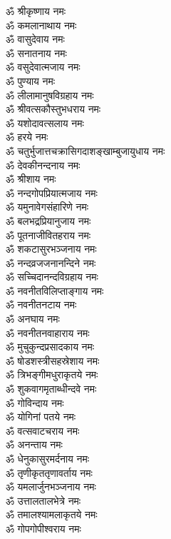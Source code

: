 \begin{center}
\begin{multicols}{2}\setlength{\columnseprule}{1pt}
\begin{flushleft}
ॐ श्रीकृष्णाय नमः\\
ॐ कमलानाथाय नमः\\
ॐ वासुदेवाय नमः\\
ॐ सनातनाय नमः\\
ॐ वसुदेवात्मजाय नमः\\
ॐ पुण्याय नमः\\
ॐ लीलामानुषविग्रहाय नमः\\
ॐ श्रीवत्सकौस्तुभधराय नमः\\
ॐ यशोदावत्सलाय नमः\\
ॐ हरये नमः\hfill{}\\
ॐ चतुर्भुजात्तचक्रासि\-गदाशङ्खाम्बुजायुधाय नमः\\
ॐ देवकीनन्दनाय नमः\\
ॐ श्रीशाय नमः\\
ॐ नन्दगोपप्रियात्मजाय नमः\\
ॐ यमुनावेगसंहारिणे नमः\\
ॐ बलभद्रप्रियानुजाय नमः\\
ॐ पूतनाजीवितहराय नमः\\
ॐ शकटासुरभञ्जनाय नमः\\
ॐ नन्दव्रजजनानन्दिने नमः\\
ॐ सच्चिदानन्दविग्रहाय नमः\hfill{}\\
ॐ नवनीतविलिप्ताङ्गाय नमः\\
ॐ नवनीतनटाय नमः\\
ॐ अनघाय नमः\\
ॐ नवनीतनवाहाराय नमः\\
ॐ मुचुकुन्दप्रसादकाय नमः\\
ॐ षोडशस्त्रीसहस्रेशाय नमः\\
ॐ त्रिभङ्गीमधुराकृतये नमः\\
ॐ शुकवागमृताब्धीन्दवे नमः\\
ॐ गोविन्दाय नमः\\
ॐ योगिनां पतये नमः\hfill{}\\
ॐ वत्सवाटचराय नमः\\
ॐ अनन्ताय नमः\\
ॐ धेनुकासुरमर्दनाय नमः\\
ॐ तृणीकृततृणावर्ताय नमः\\
ॐ यमलार्जुनभञ्जनाय नमः\\
ॐ उत्तालतालभेत्रे नमः\\
ॐ तमालश्यामलाकृतये नमः\\
ॐ गोपगोपीश्वराय नमः\\

\end{flushleft}
\end{multicols}
\end{center}
